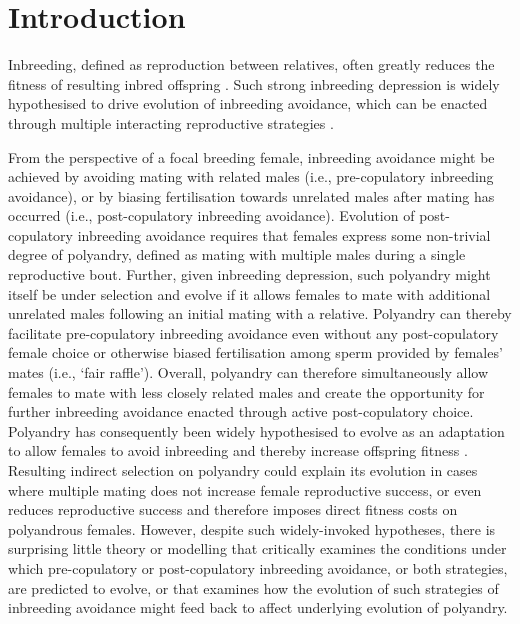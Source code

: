 \documentclass[10pt,letterpaper]{article}
\begin{document}
\section*{Introduction}

Inbreeding, defined as reproduction between relatives, often greatly reduces the fitness of resulting inbred offspring \cite[termed `inbreeding depression';][]{Charlesworth1999, Keller2002, Charlesworth2009}. Such strong inbreeding depression is widely hypothesised to drive evolution of inbreeding avoidance, which can be enacted through multiple interacting reproductive strategies \cite[][]{Parker1979, Parker2006, Pusey1996, Szulkin2012}. 

From the perspective of a focal breeding female, inbreeding avoidance might be achieved by avoiding mating with related males (i.e., pre-copulatory inbreeding avoidance), or by biasing fertilisation towards unrelated males after mating has occurred (i.e., post-copulatory inbreeding avoidance). Evolution of post-copulatory inbreeding avoidance requires that females express some non-trivial degree of polyandry, defined as mating with multiple males during a single reproductive bout. Further, given inbreeding depression, such polyandry might itself be under selection and evolve if it allows females to mate with additional unrelated males following an initial mating with a relative. Polyandry can thereby facilitate pre-copulatory inbreeding avoidance even without any post-copulatory female choice or otherwise biased fertilisation among sperm provided by females' mates (i.e., `fair raffle'). Overall, polyandry can therefore simultaneously allow females to mate with less closely related males and create the opportunity for further inbreeding avoidance enacted through active post-copulatory choice. Polyandry has consequently been widely hypothesised to evolve as an adaptation to allow females to avoid inbreeding and thereby increase offspring fitness \cite[][]{Zeh1997, Jennions2000, Tregenza2002}. Resulting indirect selection on polyandry could explain its evolution in cases where multiple mating does not increase female reproductive success, or even reduces reproductive success and therefore imposes direct fitness costs on polyandrous females. However, despite such widely-invoked hypotheses, there is surprising little theory or modelling that critically examines the conditions under which pre-copulatory or post-copulatory inbreeding avoidance, or both strategies, are predicted to evolve, or that examines how the evolution of such strategies of inbreeding avoidance might feed back to affect underlying evolution of polyandry.
\end{document}
